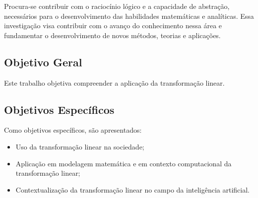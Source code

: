 Procura-se contribuir com o raciocínio lógico e a capacidade de abstração, necessários para o desenvolvimento das habilidades matemáticas e analíticas. Essa investigação visa contribuir com o avanço do conhecimento nessa área e fundamentar o desenvolvimento de novos métodos, teorias e aplicações. 

\subsection{Objetivo Geral}
Este trabalho objetiva compreender a aplicação da transformação linear.

\subsection{Objetivos Específicos}
Como objetivos específicos, são apresentados:

\begin{itemize}
	\item Uso da transformação linear na sociedade;
	\item Aplicação em modelagem matemática e em contexto computacional da transformação linear;
	\item Contextualização da transformação linear no campo da inteligência artificial. 
\end{itemize}
